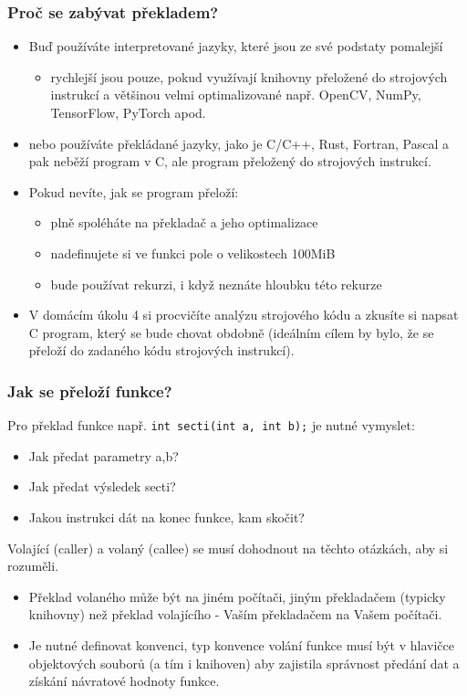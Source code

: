 \documentclass{beamer}
\begin{document}
\begin{frame}
\frametitle{Proč se zabývat překladem?}

\begin{itemize}
 \item Buď používáte interpretované jazyky, které jsou ze své podstaty pomalejší 
 \begin{itemize}
 \item rychlejší jsou pouze, pokud využívají knihovny přeložené do strojových instrukcí a většinou velmi optimalizované např. OpenCV, NumPy, TensorFlow,  PyTorch apod.
 \end{itemize}
 \item nebo používáte překládané jazyky, jako je C/C++, Rust, Fortran, Pascal a pak neběží program v C, ale program přeložený do strojových instrukcí. 
 \item Pokud nevíte, jak se program přeloží:
\begin{itemize}
 \item plně spoléháte na překladač a jeho optimalizace
 \item nadefinujete si ve funkci pole o velikostech 100MiB
 \item bude používat rekurzi, i když neznáte hloubku této rekurze
\end{itemize}
\item V domácím úkolu 4 si procvičíte analýzu strojového kódu a zkusíte si napsat C program, který se bude chovat obdobně (ideálním cílem by bylo, že se přeloží do zadaného kódu strojových instrukcí). 
\end{itemize}
\end{frame}


\begin{frame}
\frametitle{Jak se přeloží funkce?}

Pro překlad funkce např. \texttt{int secti(int a, int b);} je nutné vymyslet:
\begin{itemize}
 \item Jak předat parametry a,b?
 \item Jak předat výsledek secti?
 \item Jakou instrukci dát na konec funkce, kam skočit?
\end{itemize}

Volající (caller) a volaný (callee) se musí dohodnout na těchto otázkách, aby si rozuměli.
\begin{itemize}
 \item Překlad volaného může být na jiném počítači, jiným překladačem (typicky knihovny) než překlad volajícího - Vaším překladačem na Vašem počítači.
 \item Je nutné definovat konvenci, typ konvence volání funkce musí být v hlavičce objektových souborů (a tím i knihoven) aby zajistila správnost předání dat a získání návratové hodnoty funkce.
\end{itemize}
\end{frame}
\end{document}
